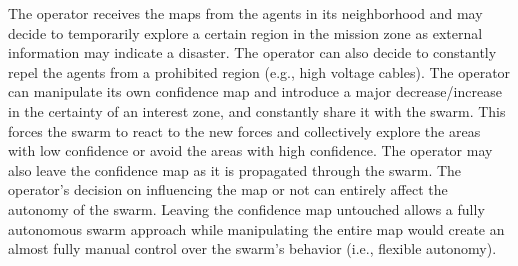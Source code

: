 \documentclass[runningheads]{llncs}%
\begin{document}
The operator receives the maps from the agents in its neighborhood and may decide to temporarily explore a certain region in the mission zone as external information may indicate a disaster. The operator can also decide to constantly repel the agents from a prohibited region (e.g., high voltage cables). The operator can manipulate its own confidence map and introduce a major decrease/increase in the certainty of an interest zone, and constantly share it with the swarm. This forces the swarm to react to the new forces and collectively explore the areas with low confidence or avoid the areas with high confidence. %
The operator may also leave the confidence map as it is propagated through the swarm. The operator's decision on influencing the map or not can entirely affect the autonomy of the swarm. Leaving the confidence map untouched allows a fully autonomous swarm approach while manipulating the entire map would create an almost fully manual control over the swarm's behavior (i.e., flexible autonomy). 
\end{document}
